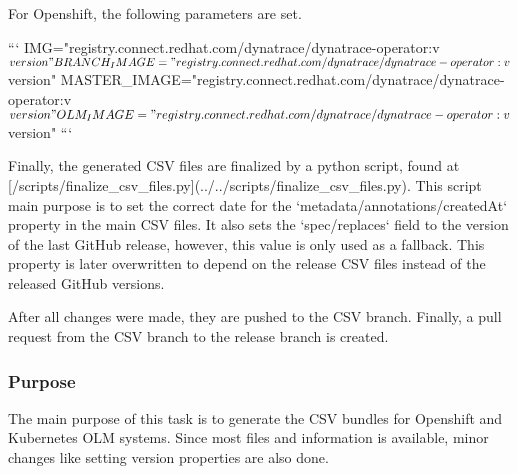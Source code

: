 For Openshift, the following parameters are set.

```
IMG="registry.connect.redhat.com/dynatrace/dynatrace-operator:v${version}"
BRANCH_IMAGE="registry.connect.redhat.com/dynatrace/dynatrace-operator:v${version}"
MASTER_IMAGE="registry.connect.redhat.com/dynatrace/dynatrace-operator:v${version}"
OLM_IMAGE="registry.connect.redhat.com/dynatrace/dynatrace-operator:v${version}"
```

Finally, the generated CSV files are finalized by a python script, found at [/scripts/finalize_csv_files.py](../../scripts/finalize_csv_files.py).
This script main purpose is to set the correct date for the `metadata/annotations/createdAt` property in the main CSV files.
It also sets the `spec/replaces` field to the version of the last GitHub release, however, this value is only used as a fallback.
This property is later overwritten to depend on the release CSV files instead of the released GitHub versions.

After all changes were made, they are pushed to the CSV branch.
Finally, a pull request from the CSV branch to the release branch is created.

\subsubsection{Purpose}\label{subsubsec:prepare-files-for-release-Purpose}

The main purpose of this task is to generate the CSV bundles for Openshift and Kubernetes OLM systems.
Since most files and information is available, minor changes like setting version properties are also done.
